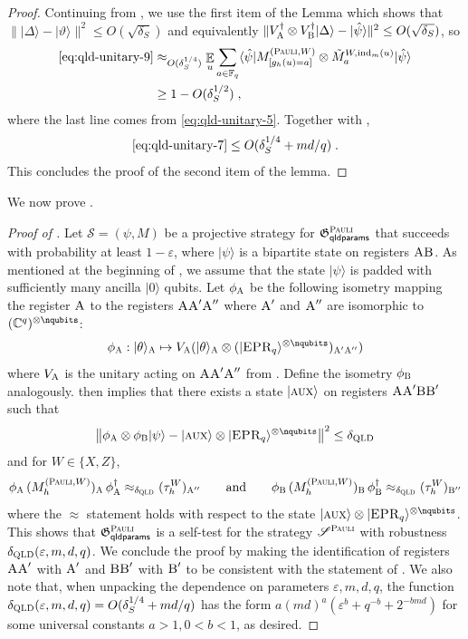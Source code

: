 \documentclass[11pt]{article}
\theoremstyle{definition}
\newcommand{\ket}[1]{|#1\rangle}
\newcommand{\bra}[1]{\langle#1|}
\newcommand{\C}{\ensuremath{\mathbb{C}}}
\newcommand{\F}{\ensuremath{\mathbb{F}}}
\newcommand{\ind}{\ensuremath{\mathrm{ind}}}
\newcommand{\eps}{\varepsilon}
\newcommand{\E}{\mathop{\mathbb{E}}\displaylimits}
\newcommand{\game}{\mathfrak{G}}
\newcommand{\strategy}{\mathscr{S}}
\newcommand{\gamestyle}[1]{\ensuremath{\textsc{#1}}\xspace}
\newcommand{\qld}{\gamestyle{QLD}}
\newcommand{\pauli}{\gamestyle{Pauli}}
\newcommand{\labelstyle}[1]{\ensuremath{\textsc{#1}}\xspace}
\newcommand{\EPR}{\labelstyle{EPR}}
\newcommand{\aux}{\labelstyle{aux}}
\newcommand{\alice}{\labelstyle{A}}
\newcommand{\bob}{\labelstyle{B}}
\newcommand{\typestyle}[1]{\ensuremath{\textsc{#1}}\xspace}
\newcommand{\Pauli}{\typestyle{Pauli}}
\newcommand{\qldparams}{\mathsf{qldparams}}
\newcommand{\notesendofpaper}{{\theendnotes}}
\newcommand{\notesendofpaper}{}
\begin{document}
\begin{proof}
	Continuing from , we use the first item of the Lemma which shows that $\| \ket{\Delta} - \ket{\vartheta} \|^2 \leq O(\sqrt{\delta_S})$ and equivalently $\| V_\alice^\dagger \otimes V_\bob^\dagger \ket{\Delta} - \ket{\hat{\psi}} \|^2 \leq O(\sqrt{\delta_S})$, so 
	\begin{align*}
		\text{\cref{eq:qld-unitary-9}} &\approx_{O(\delta_S^{1/4})} \E_u \sum_{a \in \F_q} \bra{\hat{\psi}} M^{(\Pauli,W)}_{[g_h(u)=a]} \otimes \tilde{M}^{W,\ind_m(u)}_a \ket{\hat{\psi}} \\
		&\geq 1 - O(\delta_S^{1/2})\;,
	\end{align*}
        where the last line comes from \eqref{eq:qld-unitary-5}.
	Together with , 
	\[
	\text{\cref{eq:qld-unitary-7}} \leq O(\delta_S^{1/4} + md/q)\;.	
	\]
	This concludes the proof of the second item of the lemma.
\end{proof}

We now prove . 
\begin{proof}[Proof of ]
	Let $\strategy = (\psi,M)$ be a projective strategy for $\game^\pauli_\qldparams$ that succeeds with probability at least $1 - \eps$, where $\ket{\psi}$ is a bipartite state on registers $\alice \bob$. As mentioned at the beginning of , we assume that the state $\ket{\psi}$ is padded with sufficiently many ancilla $\ket{0}$ qubits. Let $\phi_\alice$ be the following isometry mapping the register $\alice$ to the registers $\alice \alice' \alice''$ where $\alice'$ and $\alice''$ are isomorphic to $(\C^q)^{\otimes \nqubits}$:
	\[
		\phi_\alice: \ket{\theta}_\alice \mapsto V_\alice (\ket{\theta}_\alice \otimes (\ket{\EPR_q}^{\otimes \nqubits})_{\alice' \alice''})
	\]
	where $V_\alice$ is the unitary acting on $\alice \alice' \alice''$ from . Define the isometry $\phi_\bob$ analogously.  then implies that there exists a state $\ket{\aux}$ on registers $\alice \alice' \bob \bob'$ such that
	\[
		\left \| \phi_\alice \otimes \phi_\bob \ket{\psi} - \ket{\aux} \otimes \ket{\EPR_q}^{\otimes \nqubits} \right \|^2 \leq \delta_\qld
	\]
	and for $W \in \{X,Z\}$,
	\[
		\phi_\alice \, (M^{(\Pauli,W)}_h)_\alice \, \phi_\alice^\dagger \approx_{\delta_\qld} (\tau^W_h)_{\alice''} \qquad \text{and} \qquad \phi_\bob \, (M^{(\Pauli,W)}_h)_\bob \, \phi_\bob^\dagger \approx_{\delta_\qld} (\tau^W_h)_{\bob''}
	\]
	where the $\approx$ statement holds with respect to the state $\ket{\aux} \otimes \ket{\EPR_q}^{\otimes \nqubits}$. This shows that $\game^\pauli_\qldparams$ is a self-test for the strategy $\strategy^\pauli$ with robustness $\delta_\qld(\eps,m,d,q)$. We conclude the proof by making the identification of registers $\alice \alice'$ with $\alice'$ and $\bob \bob'$ with $\bob'$ to be consistent with the statement of . We also note that, when unpacking the dependence on parameters $\eps, m, d, q$, the function $\delta_\qld(\eps,m,d,q) = O(\delta_S^{1/4} + md/q)$ has the form $a(md)^a(\eps^b + q^{-b} + 2^{-bmd})$ for some universal constants $a > 1, 0 < b < 1$, as desired.
\end{proof}
 

 










		


\notesendofpaper
\end{document}
